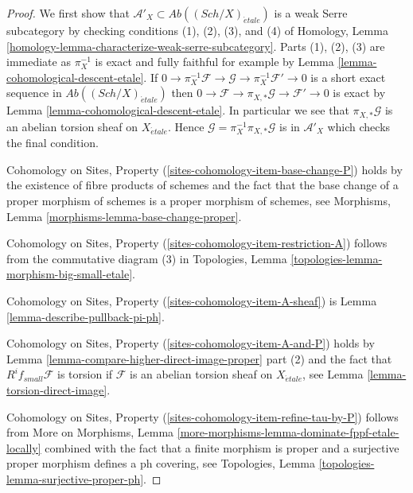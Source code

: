 \documentclass[10pt,a4paper]{amsart}
\theoremstyle{plain}
\theoremstyle{definition}
\theoremstyle{remark}
\numberwithin{equation}{subsection}
\def\Sch{\mathit{Sch}}
\def\etale{{\acute{e}tale}}
\begin{document}
\begin{proof}
We first show that $\mathcal{A}'_X \subset \textit{Ab}((\Sch/X)_\etale)$
is a weak Serre subcategory by checking conditions (1), (2), (3), and (4)
of Homology, Lemma \ref{homology-lemma-characterize-weak-serre-subcategory}.
Parts (1), (2), (3) are immediate as $\pi_X^{-1}$ is exact and
fully faithful for example by Lemma \ref{lemma-cohomological-descent-etale}. If
$0 \to \pi_X^{-1}\mathcal{F} \to \mathcal{G} \to \pi_X^{-1}\mathcal{F}' \to 0$
is a short exact sequence in $\textit{Ab}((\Sch/X)_\etale)$
then $0 \to \mathcal{F} \to \pi_{X, *}\mathcal{G} \to \mathcal{F}' \to 0$
is exact by Lemma \ref{lemma-cohomological-descent-etale}.
In particular we see that $\pi_{X, *}\mathcal{G}$ is an abelian
torsion sheaf on $X_\etale$.
Hence $\mathcal{G} = \pi_X^{-1}\pi_{X, *}\mathcal{G}$ is in
$\mathcal{A}'_X$ which checks the final condition.

\medskip\noindent
Cohomology on Sites, Property (\ref{sites-cohomology-item-base-change-P}) holds
by the existence of fibre products of schemes
and the fact that the base change of a proper morphism of
schemes is a proper morphism of schemes, see
Morphisms, Lemma \ref{morphisms-lemma-base-change-proper}.

\medskip\noindent
Cohomology on Sites, Property (\ref{sites-cohomology-item-restriction-A})
follows from the commutative diagram (3) in
Topologies, Lemma \ref{topologies-lemma-morphism-big-small-etale}.

\medskip\noindent
Cohomology on Sites, Property (\ref{sites-cohomology-item-A-sheaf}) is
Lemma \ref{lemma-describe-pullback-pi-ph}.

\medskip\noindent
Cohomology on Sites, Property (\ref{sites-cohomology-item-A-and-P}) holds by
Lemma \ref{lemma-compare-higher-direct-image-proper} part (2)
and the fact that $R^if_{small}\mathcal{F}$
is torsion if $\mathcal{F}$ is an abelian torsion
sheaf on $X_\etale$, see Lemma \ref{lemma-torsion-direct-image}.

\medskip\noindent
Cohomology on Sites, Property (\ref{sites-cohomology-item-refine-tau-by-P})
follows from More on Morphisms, Lemma
\ref{more-morphisms-lemma-dominate-fppf-etale-locally}
combined with the fact that a finite morphism is proper
and a surjective proper morphism defines a ph covering, see
Topologies, Lemma \ref{topologies-lemma-surjective-proper-ph}.
\end{proof}
\end{document}
